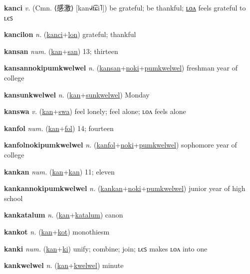 \textbf{\hypertarget{kanci}{kanci}} \textit{v.} (Cmn. ⟨{\chinese{}感激}⟩ [kan˧˩˧t͡ɕi˥])
be grateful; be thankful; \hyperlink{kancilon}{ʟᴏᴧ} feels grateful to ʟєꜱ

\textbf{\hypertarget{kancilon}{kancilon}} \textit{n.} (\hyperlink{kanci}{kanci}+\allowbreak \hyperlink{lon}{lon})
grateful; thankful

\textbf{\hypertarget{kansan}{kansan}} \textit{num.} (\hyperlink{kan}{kan}+\allowbreak \hyperlink{san}{san})
13; thirteen

\textbf{\hypertarget{kansannokipumkwelwel}{kansannokipumkwelwel}} \textit{n.} (\hyperlink{kansan}{kansan}+\allowbreak \hyperlink{noki}{noki}+\allowbreak \hyperlink{pumkwelwel}{pumkwelwel})
freshman year of college

\textbf{\hypertarget{kansunkwelwel}{kansunkwelwel}} \textit{n.} (\hyperlink{kan}{kan}+\allowbreak \hyperlink{sunkwelwel}{sunkwelwel})
Monday

\textbf{\hypertarget{kanswa}{kanswa}} \textit{v.} (\hyperlink{kan}{kan}+\allowbreak \hyperlink{swa}{swa})
feel lonely; feel alone; ʟᴏᴧ feels alone

\textbf{\hypertarget{kanfol}{kanfol}} \textit{num.} (\hyperlink{kan}{kan}+\allowbreak \hyperlink{fol}{fol})
14; fourteen

\textbf{\hypertarget{kanfolnokipumkwelwel}{kanfolnokipumkwelwel}} \textit{n.} (\hyperlink{kanfol}{kanfol}+\allowbreak \hyperlink{noki}{noki}+\allowbreak \hyperlink{pumkwelwel}{pumkwelwel})
sophomore year of college

\textbf{\hypertarget{kankan}{kankan}} \textit{num.} (\hyperlink{kan}{kan}+\allowbreak \hyperlink{kan}{kan})
11; eleven

\textbf{\hypertarget{kankannokipumkwelwel}{kankannokipumkwelwel}} \textit{n.} (\hyperlink{kankan}{kankan}+\allowbreak \hyperlink{noki}{noki}+\allowbreak \hyperlink{pumkwelwel}{pumkwelwel})
junior year of high school

\textbf{\hypertarget{kankatalum}{kankatalum}} \textit{n.} (\hyperlink{kan}{kan}+\allowbreak \hyperlink{katalum}{katalum})
canon

\textbf{\hypertarget{kankot}{kankot}} \textit{n.} (\hyperlink{kan}{kan}+\allowbreak \hyperlink{kot}{kot})
monothiesm

\textbf{\hypertarget{kanki}{kanki}} \textit{num.} (\hyperlink{kan}{kan}+\allowbreak \hyperlink{ki}{ki})
unify; combine; join; ʟєꜱ makes ʟᴏᴧ into one

\textbf{\hypertarget{kankwelwel}{kankwelwel}} \textit{n.} (\hyperlink{kan}{kan}+\allowbreak \hyperlink{kwelwel}{kwelwel})
minute

